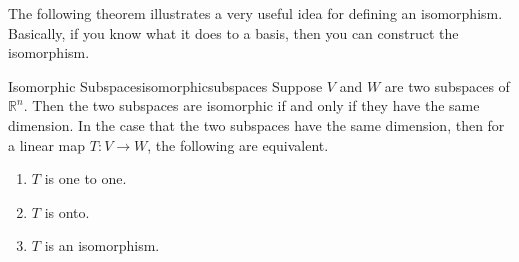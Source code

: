 The following theorem illustrates a very useful idea for defining an
isomorphism. Basically, if you know what it does to a basis, then you can
construct the isomorphism.

\begin{theorem}{Isomorphic Subspaces}{isomorphicsubspaces}
Suppose $V$ and $W$ are two subspaces of $\mathbb{R}^n$. Then the two
subspaces are isomorphic if and only if they have the same dimension. In the
case that the two subspaces have the same dimension, then for
 a linear map $T:V\rightarrow W$, the
following are equivalent.

\begin{enumerate}
\item $T$ is one to one.

\item $T$ is onto.

\item $T$ is an isomorphism.
\end{enumerate}
\end{theorem}

